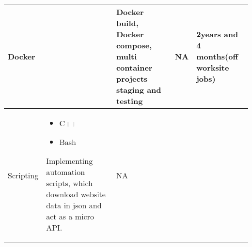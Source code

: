 \begin{center}
\begin{tabular}{|p{1.5cm}|p{2cm}|p{7cm}|p{7cm}|p{2cm}| }
 Docker 
& 
    & Docker build, Docker compose, multi container projects
    staging and testing 
& NA 
    &  2years and 4 months(off worksite jobs)\\
 \hline
Scripting
    &  \begin{itemize} 
    \item C++ 
    \item Bash 
    \end{itemize}
  Implementing automation scripts, which download website data in json and act as a micro API. 
 & NA
 & 
 & \\
 \hline
\end{tabular}
\end{center}
